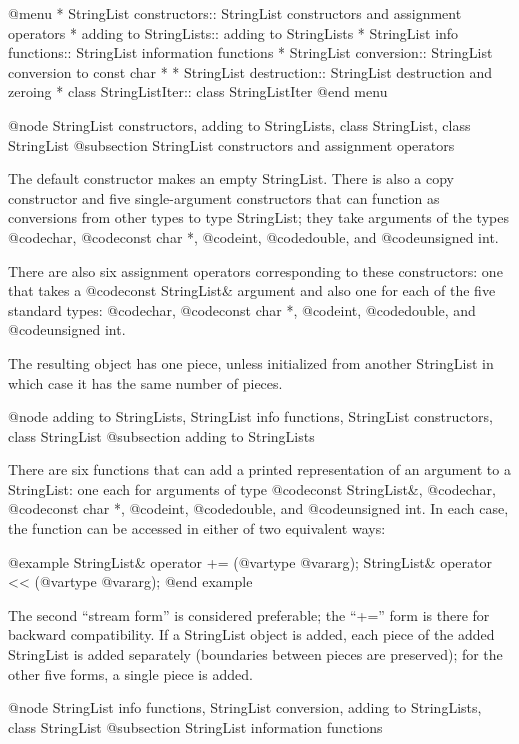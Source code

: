 @menu
* StringList constructors::     StringList constructors and assignment operators
* adding to StringLists::       adding to StringLists
* StringList info functions::   StringList information functions
* StringList conversion::       StringList conversion to const char *
* StringList destruction::      StringList destruction and zeroing
* class StringListIter::        class StringListIter
@end menu

@node StringList constructors, adding to StringLists, class StringList, class StringList
@subsection StringList constructors and assignment operators

The default constructor makes an empty StringList.  There is also
a copy constructor and five single-argument constructors that can
function as conversions from other types to type StringList; they
take arguments of the types
@code{char}, @code{const char *}, @code{int}, @code{double}, and
@code{unsigned int}.

There are also six assignment operators corresponding to these
constructors: one that takes a @code{const StringList&} argument and
also one for each of the five standard types:
@code{char}, @code{const char *}, @code{int}, @code{double}, and
@code{unsigned int}.

The resulting object has one piece, unless initialized from another
StringList in which case it has the same number of pieces.

@node adding to StringLists, StringList info functions, StringList constructors, class StringList
@subsection adding to StringLists

There are six functions that can add a printed representation of an
argument to a StringList: one each for arguments of type
@code{const StringList&}, @code{char}, @code{const char *}, @code{int},
@code{double}, and @code{unsigned int}.  In each case, the function
can be accessed in either of two equivalent ways:

@example
StringList& operator += (@var{type} @var{arg});
StringList& operator << (@var{type} @var{arg});
@end example

The second ``stream form'' is considered preferable; the ``+='' form is
there for backward compatibility.  If a StringList object is added,
each piece of the added StringList is added separately (boundaries
between pieces are preserved); for the other five forms, a single
piece is added.

@node StringList info functions, StringList conversion, adding to StringLists, class StringList
@subsection StringList information functions

